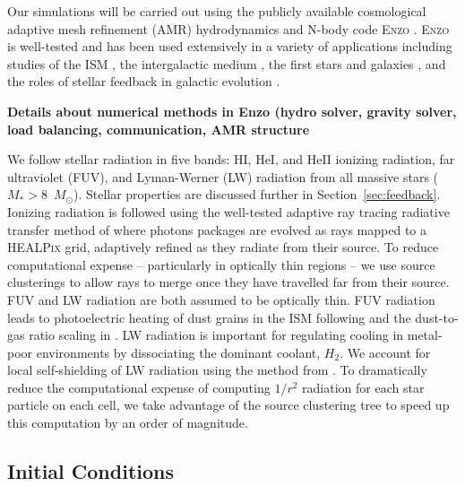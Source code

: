 \documentclass[12pt]{article} %
\begin{document}
Our simulations will be carried out using the publicly available cosmological adaptive mesh refinement (AMR) hydrodynamics and N-body code \textsc{Enzo} \citep{Enzo2014,Enzo2019}. \textsc{Enzo} is well-tested and has been used extensively in a variety of applications including studies of the ISM \citep{Slyz2005,TaskerBryan2008}, the intergalactic medium \citep{BryanMachacek2000,FangBryan2001}, the first stars and galaxies \citep{Wise2012a}, and the roles of stellar feedback in galactic evolution \citep{}.

\textbf{Details about numerical methods in Enzo (hydro solver, gravity solver, load balancing, communication, AMR structure}

We follow stellar radiation in five bands: HI, HeI, and HeII ionizing radiation, far ultraviolet (FUV), and Lyman-Werner (LW) radiation from all massive stars ($M_* > 8$~$M_{\odot}$). Stellar properties are discussed further in Section~\ref{sec:feedback}. Ionizing radiation is followed using the well-tested adaptive ray tracing radiative transfer method of \citep{WiseAbel2011} where photons packages are evolved as rays mapped to a \textsc{HEALPix} grid, adaptively refined as they radiate from their source. To reduce computational expense -- particularly in optically thin regions -- we use source clusterings to allow rays to merge once they have travelled far from their source. FUV and LW radiation are both assumed to be optically thin. FUV radiation leads to photoelectric heating of dust grains in the ISM following \cite{Wolfire2003} and the dust-to-gas ratio scaling in \cite{Remy-Ruyer2014}. LW radiation is important for regulating cooling in metal-poor environments by dissociating the dominant coolant, $H_2$. We account for local self-shielding of LW radiation using the method from \cite{Wolcott-Green2011}. To dramatically reduce the computational expense of computing $1/r^2$ radiation for each star particle on each cell, we take advantage of the source clustering tree to speed up this computation by an order of magnitude.

\subsection{Initial Conditions}
\end{document}
